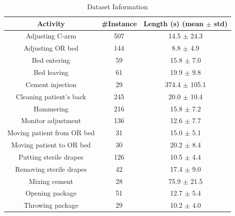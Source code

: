 \documentclass[a4paper, 10pt, conference]{ieeeconf}      %
\begin{document}
\begin{table}[h]
\centering
\begin{tabular}{|c|c|c|}
\hline
{\bf Activity}             & {\bf \#Instance} & {\bf Length (s) (mean $\pm$ std)} \\ \hline
Adjusting C-arm            & 507              & 14.5 $\pm$ 24.3                   \\ \hline
Adjusting OR bed           & 144              & 8.8 $\pm$ 4.9                     \\ \hline
Bed entering               & 59               & 15.8 $\pm$ 7.0                    \\ \hline
Bed leaving                & 61               & 19.9 $\pm$ 9.8                    \\ \hline
Cement injection           & 29               & 374.4 $\pm$ 105.1                 \\ \hline
Cleaning patient’s back    & 245              & 20.0 $\pm$ 10.4                   \\ \hline
Hammering                  & 216              & 15.8 $\pm$ 7.2                    \\ \hline
Monitor adjustment         & 136              & 12.6 $\pm$ 7.7                    \\ \hline
Moving patient from OR bed & 31               & 15.0 $\pm$ 5.1                    \\ \hline
Moving patient to OR bed   & 30               & 20.2 $\pm$ 8.4                    \\ \hline
Putting sterile drapes     & 126              & 10.5 $\pm$ 4.4                    \\ \hline
Removing sterile drapes    & 42               & 17.4 $\pm$ 9.0                    \\ \hline
Mixing cement              & 28               & 75.9 $\pm$ 21.5                   \\ \hline
Opening package            & 51               & 12.7 $\pm$ 5.4                    \\ \hline
Throwing package           & 29               & 10.2 $\pm$ 4.0                    \\ \hline
\end{tabular}
\caption{Dataset Information}
\label{fig:datasetChart}
\end{table}
\end{document}
